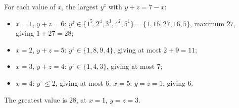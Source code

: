 For each value of $x$, the largest $y^z$ with $y+z=7-x$:
\begin{itemize}
\item $x=1$, $y+z=6$: $y^z\in\{1^5,2^4,3^3,4^2,5^1\}=\{1,16,27,16,5\}$, maximum $27$, giving $1+27=28$;
\item $x=2$, $y+z=5$: $y^z\in\{1,8,9,4\}$, giving at most $2+9=11$;
\item $x=3$, $y+z=4$: $y^z\in\{1,4,3\}$, giving at most $7$;
\item $x=4$: $y^z\le2$, giving at most $6$; $x=5$: $y=z=1$, giving $6$.
\end{itemize}
The greatest value is $\boxed{28}$, at $x=1$, $y=z=3$.
